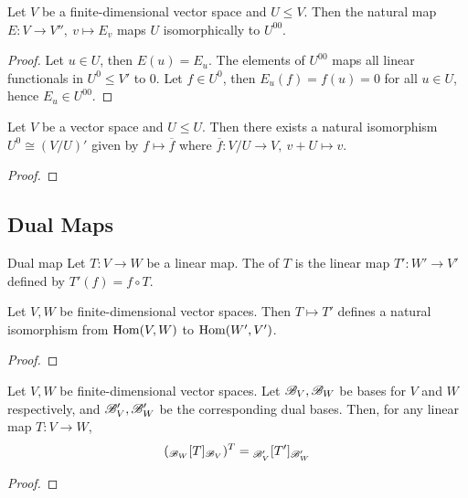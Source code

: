 \documentclass{styles/tufte}
\begin{document}
  \begin{proposition}{}{}
    Let $V$ be a finite-dimensional vector space and $U \leqslant V$. Then the natural map $E: V \to V'',\ v \mapsto E_v$ maps $U$ isomorphically to $U^{00}$.
  \end{proposition}
  \begin{proof}
    Let $u \in U$, then $E(u) = E_u$. The elements of $U^{00}$ maps all linear functionals in $U^0 \leqslant V'$ to $0$. Let $f \in U^0$, then $E_u(f) = f(u) = 0$ for all $u \in U$, hence $E_u \in U^{00}$.
  \end{proof}
  
  \begin{proposition}{}{}
    Let $V$ be a vector space and $U \leqslant U$. Then there exists a natural isomorphism $U^0 \cong (V/U)'$ given by $f \mapsto \overline{f}$ where $\overline{f}: V/U \to V,\ v + U \mapsto v$.
  \end{proposition}
  \begin{proof}
    
  \end{proof}
  
  
\subsection{Dual Maps}
  
  \begin{definition}{Dual map}{}
    Let $T: V \to W$ be a linear map. The  of $T$ is the linear map $T': W' \to V'$ defined by $T'(f) = f \circ T$.
  \end{definition}
  
  \begin{proposition}{}{}
    Let $V, W$ be finite-dimensional vector spaces. Then $T \mapsto T'$ defines a natural isomorphism from $\operatorname{Hom}(V, W)$ to $\operatorname{Hom}(W', V')$.
  \end{proposition}
  \begin{proof}
    
  \end{proof}
  
  \begin{proposition}{}{}
    Let $V, W$ be finite-dimensional vector spaces. Let $\mathscr{B}_V, \mathscr{B}_W$ be bases for $V$ and $W$ respectively, and $\mathscr{B}_V', \mathscr{B}_W'$ be the corresponding dual bases. Then, for any linear map $T: V \to W$,
    \[ ({}_{\mathscr{B}_W}[T]_{\mathscr{B}_V})^T = {}_{\mathscr{B}_V'}[T']_{\mathscr{B}_W'} \]
  \end{proposition}
  \begin{proof}
    
  \end{proof}
  
\end{document}
